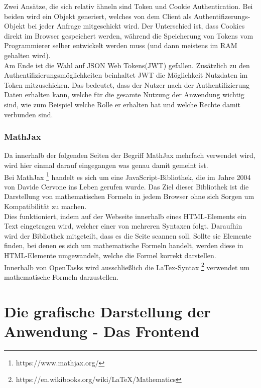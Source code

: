 Zwei Ansätze, die sich relativ ähneln sind Token und Cookie Authentication. Bei beiden wird ein Objekt generiert, welches von dem Client als Authentifizerungs-Objekt bei jeder Anfrage mitgeschickt wird. Der Unterschied ist, dass Cookies direkt im Browser gespeichert werden, während die Speicherung von Tokens vom Programmierer selber entwickelt werden muss (und dann meistens im RAM gehalten wird). \\

Am Ende ist die Wahl auf JSON Web Tokens(JWT) gefallen. Zusätzlich zu den Authentifizierungsmöglichkeiten beinhaltet JWT die Möglichkeit Nutzdaten im Token mitzuschicken. Das bedeutet, dass der Nutzer nach der Authentifizierung Daten erhalten kann, welche für die gesamte Nutzung der Anwendung wichtig sind, wie zum Beispiel welche Rolle er erhalten hat und welche Rechte damit verbunden sind. 

\subsection{MathJax}

Da innerhalb der folgenden Seiten der Begriff MathJax mehrfach verwendet wird, wird hier einmal darauf eingegangen was genau damit gemeint ist. \\

Bei MathJax \footnote{https://www.mathjax.org/} handelt es sich um eine JavaScript-Bibliothek, die im Jahre 2004 von Davide Cervone ins Leben gerufen wurde. Das Ziel dieser Bibliothek ist die Darstellung von mathematischen Formeln in jedem Browser ohne sich Sorgen um Kompatibilität zu machen. \\
Dies funktioniert, indem auf der Webseite innerhalb eines HTML-Elements ein Text eingetragen wird, welcher einer von mehreren Syntaxen folgt. Daraufhin wird der Bibliothek mitgeteilt, dass es die Seite scannen soll. Sollte sie Elemente finden, bei denen es sich um mathematische Formeln handelt, werden diese in HTML-Elemente umgewandelt, welche die Formel korrekt darstellen. \\

Innerhalb von OpenTasks wird ausschließlich die LaTex-Syntax \footnote{https://en.wikibooks.org/wiki/LaTeX/Mathematics} verwendet um mathematische Formeln darzustellen.

\chapter{Die grafische Darstellung der Anwendung - Das Frontend}

